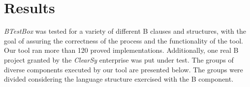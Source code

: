 \documentclass[runningheads]{llncs}
\begin{document}
\section{Results} \label{sec:Results}


\textit{BTestBox} was tested for a variety of different B clauses and structures, with the goal of assuring the correctness of the process and the functionality of the tool. Our tool ran more than 120 proved implementations. Additionally, one real B project granted by the \textit{ClearSy} enterprise was put under test. The groups of diverse components executed by our tool are presented below. The groups were divided considering the language structure exercised with the B component.

\end{document}
